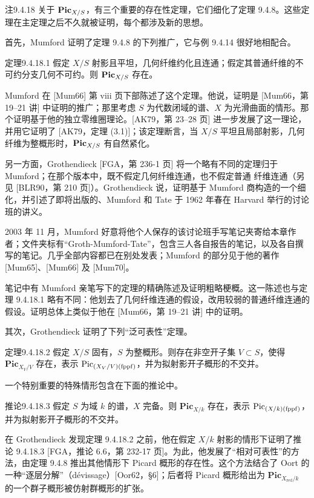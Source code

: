 \begin{origstatement}{注}{9.4.18}\label{ch09s04:9.4.18}
关于 $\mathbf{Pic}_{X/S}$，有三个重要的存在性定理，它们细化了定理 9.4.8。这些定理在主定理之后不久就被证明，每个都涉及新的思想。
\end{origstatement}
首先，Mumford 证明了定理 9.4.8 的下列推广，它与例 9.4.14 很好地相配合。

\begin{origstatement}{定理}{9.4.18.1}\label{ch09s04:9.4.18.1}
假定 $X/S$ 射影且平坦，几何纤维约化且连通；假定其普通纤维的不可约分支几何不可约。则 $\mathbf{Pic}_{X/S}$ 存在。
\end{origstatement}
Mumford 在 [Mum66] 第 viii 页下部陈述了这个定理。他说，证明是 [Mum66，第 19--21 讲] 中证明的推广；那里考虑 $S$ 为代数闭域的谱、$X$ 为光滑曲面的情形。那个证明基于他的独立零维圈理论。[AK79，第 23--28 页] 进一步发展了这一理论，并用它证明了 [AK79，定理 (3.1)]；该定理断言，当 $X/S$ 平坦且局部射影，几何纤维为整概形时，$\mathbf{Pic}_{X/S}$ 有自然紧化。

另一方面，Grothendieck [FGA，第 236-1 页] 将一个略有不同的定理归于 Mumford；在那个版本中，既不假定几何纤维连通，也不假定普通
纤维连通（另见 [BLR90，第 210 页]）。Grothendieck 说，证明基于 Mumford 商构造的一个细化，并引述了即将出版的、Mumford 和 Tate 于 1962 年春在 Harvard 举行的讨论班的讲义。

2003 年 11 月，Mumford 好意将他个人保存的该讨论班手写笔记夹寄给本章作者；文件夹标有“Groth-Mumford-Tate”，包含三人各自报告的笔记，以及各自撰写的笔记。几乎全部内容都已在别处发表；Mumford 的部分见于他的著作 [Mum65]、[Mum66] 及 [Mum70]。

笔记中有 Mumford 亲笔写下的定理的精确陈述及证明粗略梗概。这一陈述也与定理 9.4.18.1 略有不同：他划去了几何纤维连通的假设，改用较弱的普通纤维连通的假设。证明总体上类似于他在 [Mum66，第 19--21 讲] 中的证明。

其次，Grothendieck 证明了下列“泛可表性”定理。

\begin{origstatement}{定理}{9.4.18.2}\label{ch09s04:9.4.18.2}
假定 $X/S$ 固有，$S$ 为整概形。则存在非空开子集 $V\subset S$，使得 $\mathbf{Pic}_{X_V/V}$ 存在，表示 $\operatorname{Pic}_{(X_V/V)(\mathrm{fppf})}$，并为拟射影开子概形的不交并。
\end{origstatement}
一个特别重要的特殊情形包含在下面的推论中。

\begin{origstatement}{推论}{9.4.18.3}\label{ch09s04:9.4.18.3}
假定 $S$ 为域 $k$ 的谱，$X$ 完备。则 $\mathbf{Pic}_{X/k}$ 存在，表示 $\operatorname{Pic}_{(X/k)(\mathrm{fppf})}$，并为拟射影开子概形的不交并。
\end{origstatement}
在 Grothendieck 发现定理 9.4.18.2 之前，他在假定 $X/k$ 射影的情形下证明了推论 9.4.18.3 [FGA，推论 6.6，第 232-17 页]。为此，他发展了“相对可表性”的方法，由定理 9.4.8 推出其他情形下 Picard 概形的存在性。这个方法结合了 Oort 的一种“逐层分解”（dévissage）[Oor62，§6]；后者将 Picard 概形给出为 $\mathbf{Pic}_{X_{\mathrm{red}}/k}$ 的一个群子概形被仿射群概形的扩张。

